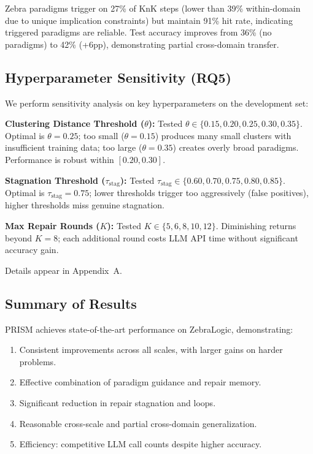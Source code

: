 Zebra paradigms trigger on 27\% of KnK steps (lower than 39\% within-domain due to unique implication constraints) but maintain 91\% hit rate, indicating triggered paradigms are reliable. Test accuracy improves from 36\% (no paradigms) to 42\% (+6pp), demonstrating partial cross-domain transfer.

\subsection{Hyperparameter Sensitivity (RQ5)}

We perform sensitivity analysis on key hyperparameters on the development set:

\textbf{Clustering Distance Threshold ($\theta$):} Tested $\theta \in \{0.15, 0.20, 0.25, 0.30, 0.35\}$. Optimal is $\theta = 0.25$; too small ($\theta = 0.15$) produces many small clusters with insufficient training data; too large ($\theta = 0.35$) creates overly broad paradigms. Performance is robust within $[0.20, 0.30]$.

\textbf{Stagnation Threshold ($\tau_{\text{stag}}$):} Tested $\tau_{\text{stag}} \in \{0.60, 0.70, 0.75, 0.80, 0.85\}$. Optimal is $\tau_{\text{stag}} = 0.75$; lower thresholds trigger too aggressively (false positives), higher thresholds miss genuine stagnation.

\textbf{Max Repair Rounds ($K$):} Tested $K \in \{5, 6, 8, 10, 12\}$. Diminishing returns beyond $K = 8$; each additional round costs LLM API time without significant accuracy gain.

Details appear in Appendix~A.

\subsection{Summary of Results}

PRISM achieves state-of-the-art performance on ZebraLogic, demonstrating:
\begin{enumerate}
    \item Consistent improvements across all scales, with larger gains on harder problems.
    \item Effective combination of paradigm guidance and repair memory.
    \item Significant reduction in repair stagnation and loops.
    \item Reasonable cross-scale and partial cross-domain generalization.
    \item Efficiency: competitive LLM call counts despite higher accuracy.
\end{enumerate}
